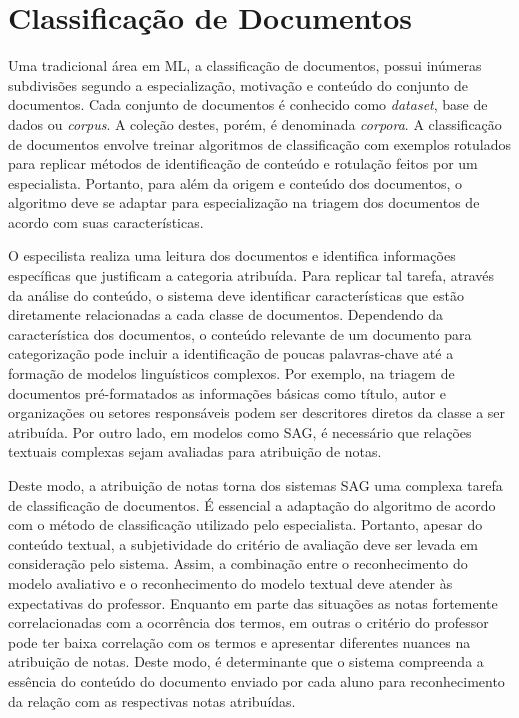\section{Classificação de Documentos}

Uma tradicional área em ML, a classificação de documentos, possui inúmeras subdivisões segundo a especialização, motivação e conteúdo do conjunto de documentos. Cada conjunto de documentos é conhecido como \textit{dataset}, base de dados ou \textit{corpus}. A coleção destes, porém, é denominada \textit{corpora}. A classificação de documentos envolve treinar algoritmos de classificação com exemplos rotulados para replicar métodos de identificação de conteúdo e rotulação feitos por um especialista. Portanto, para além da origem e conteúdo dos documentos, o algoritmo deve se adaptar para especialização na triagem dos documentos de acordo com suas características.

O especilista realiza uma leitura dos documentos e identifica informações específicas que justificam a categoria atribuída. Para replicar tal tarefa, através da análise do conteúdo, o sistema deve identificar características que estão diretamente relacionadas a cada classe de documentos. Dependendo da característica dos documentos, o conteúdo relevante de um documento para categorização pode incluir a identificação de poucas palavras-chave até a formação de modelos linguísticos complexos. Por exemplo, na triagem de documentos pré-formatados as informações básicas como título, autor e organizações ou setores responsáveis podem ser descritores diretos da classe a ser atribuída. Por outro lado, em modelos como SAG, é necessário que relações textuais complexas sejam avaliadas para atribuição de notas.

Deste modo, a atribuição de notas torna dos sistemas SAG uma complexa tarefa de classificação de documentos. É essencial a adaptação do algoritmo de acordo com o método de classificação utilizado pelo especialista. Portanto, apesar do conteúdo textual, a subjetividade do critério de avaliação deve ser levada em consideração pelo sistema. Assim, a combinação entre o reconhecimento do modelo avaliativo e o reconhecimento do modelo textual deve atender às expectativas do professor. Enquanto em parte das situações as notas fortemente correlacionadas com a ocorrência dos termos, em outras o critério do professor pode ter baixa correlação com os termos e apresentar diferentes nuances na atribuição de notas. Deste modo, é determinante que o sistema compreenda a essência do conteúdo do documento enviado por cada aluno para reconhecimento da relação com as respectivas notas atribuídas.

